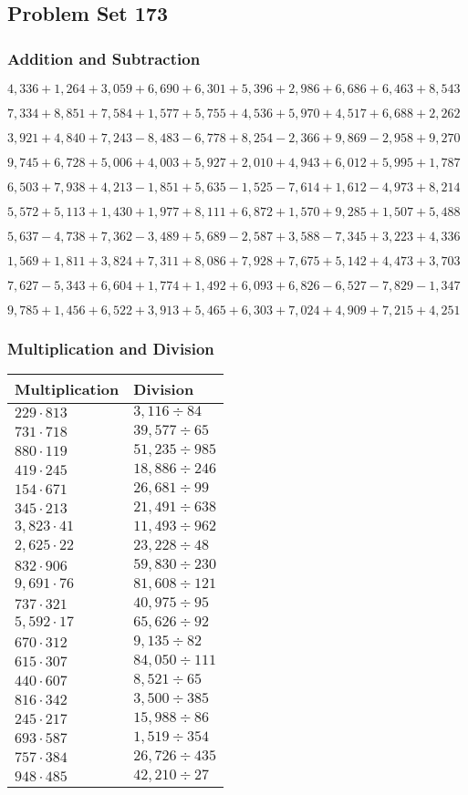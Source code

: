 \hypertarget{problem-set-173}{%
\subsection{Problem Set 173}\label{problem-set-173}}

\hypertarget{addition-and-subtraction}{%
\subsubsection{Addition and
Subtraction}\label{addition-and-subtraction}}

\(4,336+1,264+3,059+6,690+6,301+5,396+2,986+6,686+6,463+8,543\)

\(7,334+8,851+7,584+1,577+5,755+4,536+5,970+4,517+6,688+2,262\)

\(3,921+4,840+7,243-8,483-6,778+8,254-2,366+9,869-2,958+9,270\)

\(9,745+6,728+5,006+4,003+5,927+2,010+4,943+6,012+5,995+1,787\)

\(6,503+7,938+4,213-1,851+5,635-1,525-7,614+1,612-4,973+8,214\)

\(5,572+5,113+1,430+1,977+8,111+6,872+1,570+9,285+1,507+5,488\)

\(5,637-4,738+7,362-3,489+5,689-2,587+3,588-7,345+3,223+4,336\)

\(1,569+1,811+3,824+7,311+8,086+7,928+7,675+5,142+4,473+3,703\)

\(7,627-5,343+6,604+1,774+1,492+6,093+6,826-6,527-7,829-1,347\)

\(9,785+1,456+6,522+3,913+5,465+6,303+7,024+4,909+7,215+4,251\)

\hypertarget{multiplication-and-division}{%
\subsubsection{Multiplication and
Division}\label{multiplication-and-division}}

\begin{longtable}[]{@{}ll@{}}
\toprule
Multiplication & Division\tabularnewline
\midrule
\endhead
\(229\cdot813\) & \(3,116÷84\)\tabularnewline
\(731\cdot718\) & \(39,577÷65\)\tabularnewline
\(880\cdot119\) & \(51,235÷985\)\tabularnewline
\(419\cdot245\) & \(18,886÷246\)\tabularnewline
\(154\cdot671\) & \(26,681÷99\)\tabularnewline
\(345\cdot213\) & \(21,491÷638\)\tabularnewline
\(3,823\cdot41\) & \(11,493÷962\)\tabularnewline
\(2,625\cdot22\) & \(23,228÷48\)\tabularnewline
\(832\cdot906\) & \(59,830÷230\)\tabularnewline
\(9,691\cdot76\) & \(81,608÷121\)\tabularnewline
\(737\cdot321\) & \(40,975÷95\)\tabularnewline
\(5,592\cdot17\) & \(65,626÷92\)\tabularnewline
\(670\cdot312\) & \(9,135÷82\)\tabularnewline
\(615\cdot307\) & \(84,050÷111\)\tabularnewline
\(440\cdot607\) & \(8,521÷65\)\tabularnewline
\(816\cdot342\) & \(3,500÷385\)\tabularnewline
\(245\cdot217\) & \(15,988÷86\)\tabularnewline
\(693\cdot587\) & \(1,519÷354\)\tabularnewline
\(757\cdot384\) & \(26,726÷435\)\tabularnewline
\(948\cdot485\) & \(42,210÷27\)\tabularnewline
\bottomrule
\end{longtable}
